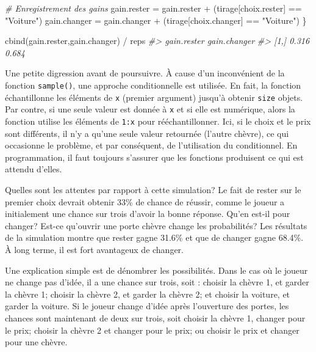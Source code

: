 \documentclass[
]{book}
\newenvironment{Shaded}{}{}
\newcommand{\CommentTok}[1]{\textit{#1}}
\newcommand{\FunctionTok}[1]{#1}
\newcommand{\NormalTok}[1]{#1}
\newcommand{\OtherTok}[1]{#1}
\newcommand{\SpecialCharTok}[1]{#1}
\newcommand{\StringTok}[1]{#1}
\begin{document}
\begin{Shaded}
\begin{Highlighting}[]
  \CommentTok{\# Enregistrement des gains}
\NormalTok{  gain.rester }\OtherTok{=}\NormalTok{ gain.rester }\SpecialCharTok{+}\NormalTok{ (tirage[choix.rester] }\SpecialCharTok{==} \StringTok{"Voiture"}\NormalTok{)}
\NormalTok{  gain.changer }\OtherTok{=}\NormalTok{ gain.changer }\SpecialCharTok{+}\NormalTok{ (tirage[choix.changer] }\SpecialCharTok{==} \StringTok{"Voiture"}\NormalTok{)}
\NormalTok{\}}

\FunctionTok{cbind}\NormalTok{(gain.rester,gain.changer)  }\SpecialCharTok{/}\NormalTok{ reps}
\CommentTok{\#\textgreater{}      gain.rester gain.changer}
\CommentTok{\#\textgreater{} [1,]       0.316        0.684}
\end{Highlighting}
\end{Shaded}

Une petite digression avant de poursuivre. À cause d'un inconvénient de la fonction \texttt{sample()}, une approche conditionnelle est utilisée. En fait, la fonction échantillonne les éléments de \texttt{x} (premier argument) jusqu'à obtenir \texttt{size} objets. Par contre, si une seule valeur est donnée à \texttt{x} et si elle est numérique, alors la fonction utilise les éléments de \texttt{1:x} pour rééchantillonner. Ici, si le choix et le prix sont différents, il n'y a qu'une seule valeur retournée (l'autre chèvre), ce qui occasionne le problème, et par conséquent, de l'utilisation du conditionnel. En programmation, il faut toujours s'assurer que les fonctions produisent ce qui est attendu d'elles.

Quelles sont les attentes par rapport à cette simulation? Le fait de rester sur le premier choix devrait obtenir 33\% de chance de réussir, comme le joueur a initialement une chance sur trois d'avoir la bonne réponse. Qu'en est-il pour changer? Est-ce qu'ouvrir une porte chèvre change les probabilités? Les résultats de la simulation montre que rester gagne 31.6\% et que de changer gagne 68.4\%. À long terme, il est fort avantageux de changer.

Une explication simple est de dénombrer les possibilités. Dans le cas où le joueur ne change pas d'idée, il a une chance sur trois, soit : choisir la chèvre 1, et garder la chèvre 1; choisir la chèvre 2, et garder la chèvre 2; et choisir la voiture, et garder la voiture. Si le joueur change d'idée après l'ouverture des portes, les chances sont maintenant de deux sur trois, soit choisir la chèvre 1, changer pour le prix; choisir la chèvre 2 et changer pour le prix; ou choisir le prix et changer pour une chèvre.
\end{document}
